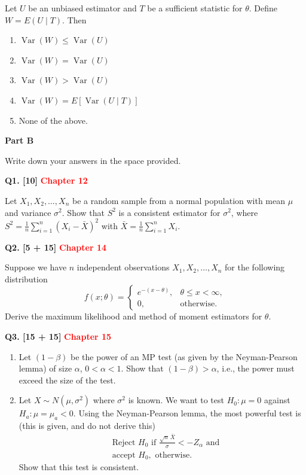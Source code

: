 \documentclass[11pt]{article}
\begin{document}
Let $U$ be an unbiased estimator and $T$ be a sufficient statistic for $\theta$. Define $W=E(U\mid T)$. Then
\begin{enumerate}
\setlength{\itemsep}{0pt}\setlength{\parsep}{0pt}\setlength{\topsep}{2pt}
\item[(a)] $\operatorname{Var}(W)\leq\operatorname{Var}(U)$
\item[(b)] $\operatorname{Var}(W)=\operatorname{Var}(U)$
\item[(c)] $\operatorname{Var}(W)>\operatorname{Var}(U)$
\item[(d)] $\operatorname{Var}(W)=E[\operatorname{Var}(U\mid T)]$
\item[(e)] None of the above.
\end{enumerate}
\endgroup

\clearpage
\begin{center}
\textbf{Part B}
\end{center}

Write down your answers in the space provided.

\medskip
\textbf{Q1. [10]}  \textbf{\textcolor{red}{Chapter 12}}

Let $X_1,X_2,\ldots,X_n$ be a random sample from a normal population with mean $\mu$ and variance $\sigma^2$. Show that $S^2$ is a consistent estimator for $\sigma^2$, where $S^2=\frac{1}{n}\sum_{i=1}^n(X_i-\bar X)^2$ with $\bar X=\frac{1}{n}\sum_{i=1}^n X_i$.

\bigskip
\textbf{Q2. [5 + 15]}  \textbf{\textcolor{red}{Chapter 14}}

Suppose we have $n$ independent observations $X_1,X_2,\ldots,X_n$ for the following distribution
\[
 f(x;\theta)=
 \begin{cases}
 e^{-(x-\theta)},&\theta\leq x<\infty,\\
 0,&\text{otherwise}.
 \end{cases}
\]
Derive the maximum likelihood and method of moment estimators for $\theta$.

\bigskip
\textbf{Q3. [15 + 15]}  \textbf{\textcolor{red}{Chapter 15}}

\begin{enumerate}
\setlength{\itemsep}{7pt}\setlength{\parsep}{0pt}\setlength{\topsep}{3pt}
\item[(i)] Let $(1-\beta)$ be the power of an MP test (as given by the Neyman-Pearson lemma) of size $\alpha$, $0<\alpha<1$. Show that $(1-\beta)>\alpha$, i.e., the power must exceed the size of the test.
\item[(ii)] Let $X\sim N(\mu,\sigma^2)$ where $\sigma^2$ is known. We want to test $H_0:\mu=0$ against $H_a:\mu=\mu_a<0$. Using the Neyman-Pearson lemma, the most powerful test is (this is given, and do not derive this)
\[
\begin{aligned}
&\text{Reject }H_0\text{ if }\frac{\sqrt n\,\bar X}{\sigma}<-Z_{\alpha}\text{ and}\\
&\text{accept }H_0,\text{ otherwise.}
\end{aligned}
\]
Show that this test is consistent.
\end{enumerate}
\end{document}
